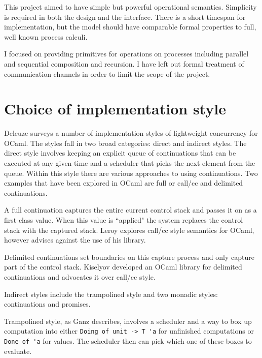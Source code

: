 \documentclass[12pt,twoside,notitlepage]{report}
\theoremstyle{plain}%
\theoremstyle{definition}
\theoremstyle{remark}
\begin{document}

This project aimed to have simple but powerful operational semantics. Simplicity is required in both the design and the interface. There is a short timespan for implementation, but the model should have comparable formal properties to full, well known process calculi. 

I focused on providing primitives for operations on processes including parallel and sequential composition and recursion. I have left out formal treatment of communication channels in order to limit the scope of the project.  


\section{Choice of implementation style}  
Deleuze\cite{deleuzelight} surveys a number of implementation styles of lightweight concurrency for OCaml. The styles fall in two broad categories: direct and indirect styles. The direct style involves keeping an explicit queue of continuations that can be executed at any given time and a scheduler that picks the next element from the queue.  Within this style there are various approaches to using continuations. Two examples that have been explored in OCaml are full or call/cc and delimited continuations. 

A full continuation captures the entire current control stack and passes it on as a first class value. When this value is ``applied" the system replaces the control stack with the captured stack. Leroy\cite{leroyocaml} explores call/cc style semantics for OCaml, however advises against the use of his library.

Delimited continuations set boundaries on this capture process and only capture part of the control stack. Kiselyov\cite{kiselyov2010delimited, kiselyov2012delimited} developed an OCaml library for delimited continuations and advocates it over call/cc style.

Indirect styles include the trampolined style and two monadic styles: continuations and promises. 

Trampolined style, as Ganz\cite{ganz1999trampolined} describes, involves a scheduler and a way to box up computation into either \lstinline|Doing of unit -> T 'a| for unfinished computations or \lstinline|Done of 'a| for values. The scheduler then can pick which one of these boxes to evaluate. 
\end{document}
